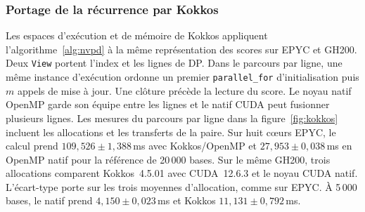 


\subsubsection{Portage de la récurrence par Kokkos}
Les espaces d'exécution et de mémoire de Kokkos appliquent l'algorithme~\ref{alg:nvpd} à la même représentation des scores sur EPYC et GH200. Deux \texttt{View} portent l'index et les lignes de DP. Dans le parcours par ligne, une même instance d'exécution ordonne un premier \texttt{parallel\_for} d'initialisation puis \(m\) appels de mise à jour. Une clôture précède la lecture du score. Le noyau natif OpenMP garde son équipe entre les lignes et le natif CUDA peut fusionner plusieurs lignes.
Les mesures du parcours par ligne dans la figure~\ref{fig:kokkos} incluent les allocations et les transferts de la paire. Sur huit cœurs EPYC, le calcul prend \(109{,}526\pm1{,}388\)\,ms avec Kokkos/OpenMP et \(27{,}953\pm0{,}038\)\,ms en OpenMP natif pour la référence de 20\,000 bases. Sur le même GH200, trois allocations comparent Kokkos~4.5.01 avec CUDA~12.6.3 et le noyau CUDA natif. L'écart-type porte sur les trois moyennes d'allocation, comme sur EPYC. À 5\,000 bases, le natif prend \(4{,}150\pm0{,}023\)\,ms et Kokkos \(11{,}131\pm0{,}792\)\,ms.



